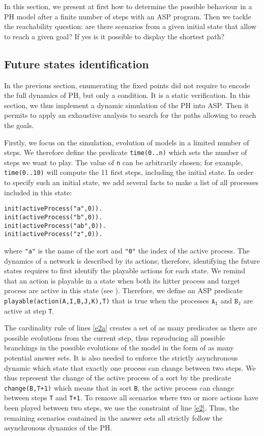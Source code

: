 
In this section, we present at first how to determine the possible behaviour in a PH model after a finite number of steps with an ASP program.
Then we tackle the reachability question: are there scenarios from a given initial state
that allow to reach a given goal? If yes is it possible to display the shortest path?

\subsection{Future states identification}
In the previous section, enumerating the fixed points did not require to
encode the full dynamics of PH, but only a condition. It is a static verification.
In this section, we thus implement a dynamic simulation of the PH into ASP. Then it permits to apply an exhaustive analysis to search for the paths allowing to reach the goals.

Firstly, we focus on the simulation, evolution of models in a limited number of steps.
We therefore define the predicate \texttt{time(0..n)} which sets the number of steps we want to play.
The value of \texttt{n} can be arbitrarily chosen;
for example, \texttt{time(0..10)} will compute the 11 first steps,
including the initial state.
In order to specify such an initial state, we add several facts
to make a list of all processes included in this state:
\begin{lstlisting}
init(activeProcess("a",0)). 
init(activeProcess("b",0)).
init(activeProcess("ab",0)).
init(activeProcess("z",0)).
\end{lstlisting}
where \texttt{"a"} is the name of the sort and \texttt{"0"} the index of the active process.
The dynamics of a network is described by its actions;
therefore, identifying the future states requires to first identify the playable actions for each state.
We remind that an action is playable in a state when both its hitter process and target process are active in this state (see ).
Therefore, we define an ASP predicate \texttt{playable(action(A,I,B,J,K),T)} that is true
when the processes $\texttt{A}_\texttt{I}$ and $\texttt{B}_\texttt{J}$ are active at step \texttt{T}.

The cardinality rule of lines \ref{e2a}
creates a set of as many predicates as there are possible evolutions from the current step,
thus reproducing all possible branchings in the possible evolutions of the model in the form of as many potential answer sets. It is also needed to enforce the strictly asynchronous dynamic
which state that exactly one process can change between two steps.
We thus represent the change of the active process of a sort
by the predicate \texttt{change(B,T+1)}
which means that in sort \texttt{B}, the active process can change between steps \texttt{T} and \texttt{T+1}.
To remove all scenarios where two or more actions have been played between
two steps, we use the constraint of line \ref{e2}.
Thus, the remaining scenarios contained in the answer sets all strictly follow
the asynchronous dynamics of the PH.

